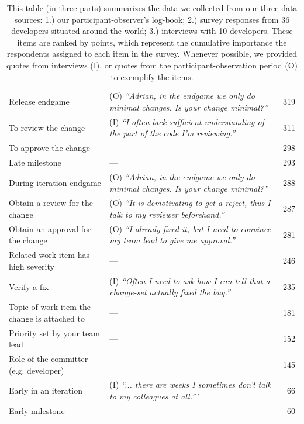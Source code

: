 \documentclass{sig-alternate}
\begin{document}
\begin{table}[tbh!]
{\begin{tabular}{@{}l@{\hspace{5pt}}l@{}r@{}}
\midrule
Release endgame & (O) \emph{``Adrian, in the endgame we only do minimal changes. Is your change minimal?''}& 319\\
To review the change &(I) \emph{``I often lack sufficient understanding of the part of the code I'm reviewing.''}& 311\\
To approve the change &--- & 298\\
Late milestone &--- & 293\\
During iteration endgame &(O) \emph{``Adrian, in the endgame we only do minimal changes. Is your change minimal?''}& 288\\
Obtain a review for the change &(O) \emph{``It is demotivating to get a reject, thus I talk to my reviewer beforehand.''}& 287\\
Obtain an approval for the change &(O) \emph{``I already fixed it, but I  need to convince my team lead to give me approval.''}& 281\\
Related work item has high severity &--- & 246\\
Verify a fix &(I) \emph{``Often I need to ask how I can tell that a change-set actually fixed the bug.''}& 235\\
Topic of work item the change is attached to &--- & 181\\
Priority set by your team lead&--- & 152\\
Role of the committer (e.g. developer) &--- & 145\\
Early in an iteration &(I) \emph{``... there are weeks I sometimes don't talk to my colleagues at all.'''}& 66\\
 Early milestone &--- & 60\\%
\bottomrule
\end{tabular}
\label{tab:sub-process}
}
\caption{This table (in three parts) summarizes the data we collected from our three data sources: 1.) our participant-observer's log-book; 2.) survey responses from 36 developers situated around the world; 3.) interviews with 10 developers.  These items are ranked by points, which represent the cumulative importance the respondents assigned to each item in the survey.  Whenever possible, we provided quotes from interviews (I), or quotes from the participant-observation period (O) to exemplify the items.}
\addtocounter{table}{-1}
\label{tab:surveyfactors}
\end{table}


%
\end{document}
